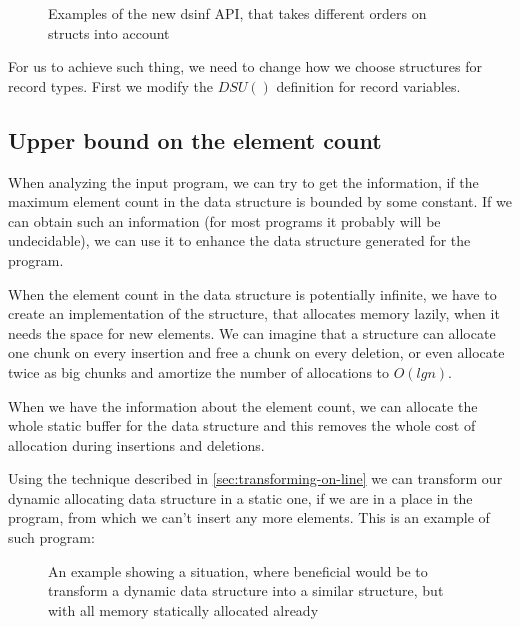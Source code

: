 \documentclass[a4paper,11pt]{article}
\begin{document}
			\begin{figure}
				

				\caption{Examples of the new dsinf API, that takes different orders on structs into
				account}

				\label{fig:struct-new}
			\end{figure}

			For us to achieve such thing, we need to change how we choose structures for record types. First
			we modify the $DSU()$ definition for record variables.

	\subsection{Upper bound on the element count}

		When analyzing the input program, we can try to get the information, if the maximum element count in the
		data structure is bounded by some constant. If we can obtain such an information (for most programs it
		probably will be undecidable), we can use it to enhance the data structure generated for the program.

		When the element count in the data structure is potentially infinite, we have to create an
		implementation of the structure, that allocates memory lazily, when it needs the space for new elements.
		We can imagine that a structure can allocate one chunk on every insertion and free a chunk on every
		deletion, or even allocate twice as big chunks and amortize the number of allocations to $O(lg n)$.

		When we have the information about the element count, we can allocate the whole static buffer for the
		data structure and this removes the whole cost of allocation during insertions and deletions.

		Using the technique described in \autoref{sec:transforming-on-line} we can transform our dynamic
		allocating data structure in a static one, if we are in a place in the program, from which we can't
		insert any more elements. This is an example of such program:

		\begin{figure}
			

			\caption{An example showing a situation, where beneficial would be to transform a dynamic data
			structure into a similar structure, but with all memory statically allocated already}

			\label{fig:upper-bound-transform}
		\end{figure}
\end{document}
